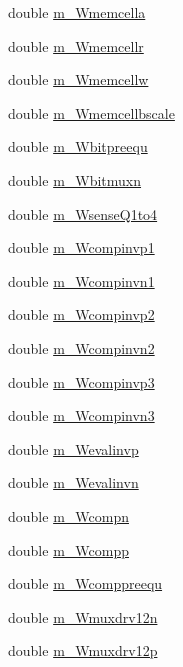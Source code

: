 \begin{DoxyCompactItemize}
double \hyperlink{classTechParameter_a3fb4487ee4252edfbb86a690687f7c44}{m\_\-Wmemcella}
\item 
double \hyperlink{classTechParameter_aa93da51bf832c5e6c5c40b06268f72d6}{m\_\-Wmemcellr}
\item 
double \hyperlink{classTechParameter_a4797894a1f6a276660d971f625750191}{m\_\-Wmemcellw}
\item 
double \hyperlink{classTechParameter_a6b38ab58931c30be2e5e30f52c51a7e6}{m\_\-Wmemcellbscale}
\item 
double \hyperlink{classTechParameter_ad1a685cdb3f3ddfb32ad55ad5cc64d12}{m\_\-Wbitpreequ}
\item 
double \hyperlink{classTechParameter_aa0d1b5acd4bb1ffd80bbf3fb539b6379}{m\_\-Wbitmuxn}
\item 
double \hyperlink{classTechParameter_ac6cd382241dce37197dcb3245165c1a0}{m\_\-WsenseQ1to4}
\item 
double \hyperlink{classTechParameter_a619c3e0eea9a880f147be4763a6fcb48}{m\_\-Wcompinvp1}
\item 
double \hyperlink{classTechParameter_a01a8865e05b8f9460ca749ce18019a89}{m\_\-Wcompinvn1}
\item 
double \hyperlink{classTechParameter_a3332d4a180fab4b82f0931293499c73d}{m\_\-Wcompinvp2}
\item 
double \hyperlink{classTechParameter_ad93de04d1d122d5fd4b4ff0ab41e44ae}{m\_\-Wcompinvn2}
\item 
double \hyperlink{classTechParameter_a16fcd5cdcb8cdb6ac2086c80c7e16e07}{m\_\-Wcompinvp3}
\item 
double \hyperlink{classTechParameter_a0c8c70c468336393070e2a17334aab9b}{m\_\-Wcompinvn3}
\item 
double \hyperlink{classTechParameter_ad61b1c0c2ae19d12a97f340d6b980c8c}{m\_\-Wevalinvp}
\item 
double \hyperlink{classTechParameter_a95f2b5f161c639f9884904eec45dd735}{m\_\-Wevalinvn}
\item 
double \hyperlink{classTechParameter_a69c6b38b22c101f70b8c419eadb17a48}{m\_\-Wcompn}
\item 
double \hyperlink{classTechParameter_ad6ffaca45022ccec345bea71ee209c87}{m\_\-Wcompp}
\item 
double \hyperlink{classTechParameter_a86980a6cdf91dbae0def3796b7d151b2}{m\_\-Wcomppreequ}
\item 
double \hyperlink{classTechParameter_a1e3cd32913420f1996d61a0f30c1f6d7}{m\_\-Wmuxdrv12n}
\item 
double \hyperlink{classTechParameter_a9b7d71c26b780dc385fdb2bab8f6b9c8}{m\_\-Wmuxdrv12p}

\end{DoxyCompactItemize}
